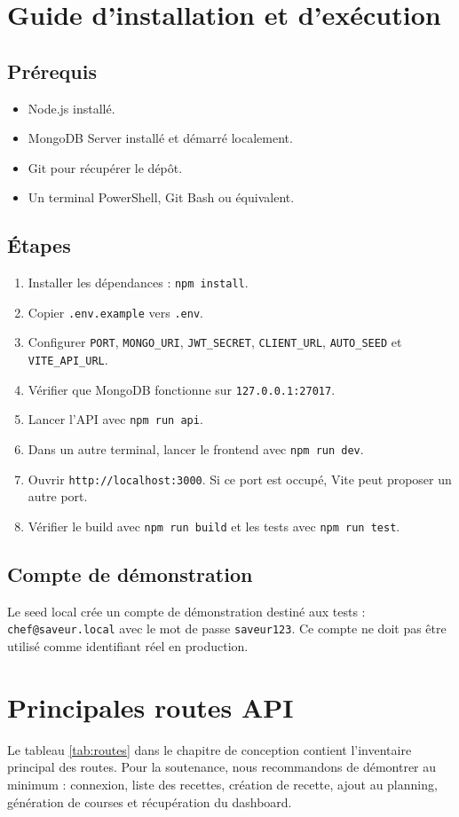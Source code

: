 \documentclass[12pt,a4paper]{report}
\begin{document}
\chapter{Guide d'installation et d'exécution}
\section*{Prérequis}
\begin{itemize}[leftmargin=*]
\item Node.js installé.
\item MongoDB Server installé et démarré localement.
\item Git pour récupérer le dépôt.
\item Un terminal PowerShell, Git Bash ou équivalent.
\end{itemize}
\section*{Étapes}
\begin{enumerate}[leftmargin=*]
\item Installer les dépendances : \texttt{npm install}.
\item Copier \texttt{.env.example} vers \texttt{.env}.
\item Configurer \texttt{PORT}, \texttt{MONGO\_URI}, \texttt{JWT\_SECRET}, \texttt{CLIENT\_URL}, \texttt{AUTO\_SEED} et \texttt{VITE\_API\_URL}.
\item Vérifier que MongoDB fonctionne sur \texttt{127.0.0.1:27017}.
\item Lancer l'API avec \texttt{npm run api}.
\item Dans un autre terminal, lancer le frontend avec \texttt{npm run dev}.
\item Ouvrir \texttt{http://localhost:3000}. Si ce port est occupé, Vite peut proposer un autre port.
\item Vérifier le build avec \texttt{npm run build} et les tests avec \texttt{npm run test}.
\end{enumerate}
\section*{Compte de démonstration}
Le seed local crée un compte de démonstration destiné aux tests : \texttt{chef@saveur.local} avec le mot de passe \texttt{saveur123}. Ce compte ne doit pas être utilisé comme identifiant réel en production.

\chapter{Principales routes API}
Le tableau \ref{tab:routes} dans le chapitre de conception contient l'inventaire principal des routes. Pour la soutenance, nous recommandons de démontrer au minimum : connexion, liste des recettes, création de recette, ajout au planning, génération de courses et récupération du dashboard.
\end{document}
